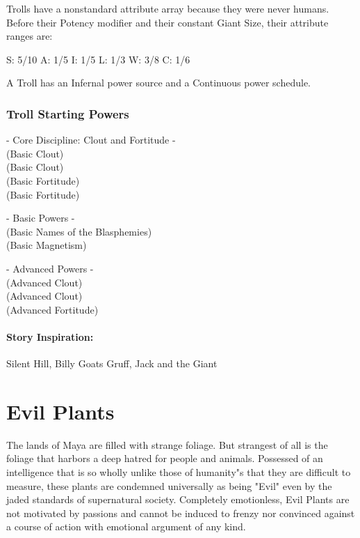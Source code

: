 Trolls have a nonstandard attribute array because they were never humans. Before their Potency modifier and their constant Giant Size, their attribute ranges are:

S: 5/10 A: 1/5 I: 1/5 L: 1/3 W: 3/8 C: 1/6

A Troll has an Infernal power source and a Continuous power schedule.

\subsubsection{Troll Starting Powers}

\hspace{\parindent} - Core Discipline: Clout and Fortitude -\\
 (Basic Clout)\\
 (Basic Clout)\\
 (Basic Fortitude)\\
 (Basic Fortitude)

- Basic Powers -\\
 (Basic Names of the Blasphemies)\\
 (Basic Magnetism)

- Advanced Powers -\\
 (Advanced Clout)\\
 (Advanced Clout)\\
 (Advanced Fortitude)

\paragraph{Story Inspiration:} Silent Hill, Billy Goats Gruff, Jack and the Giant

\section{Evil Plants} 

The lands of Maya are filled with strange foliage. But strangest of all is the foliage that harbors a deep hatred for people and animals. Possessed of an intelligence that is so wholly unlike those of humanity"s that they are difficult to measure, these plants are condemned universally as being "Evil" even by the jaded standards of supernatural society. Completely emotionless, Evil Plants are not motivated by passions and cannot be induced to frenzy nor convinced against a course of action with emotional argument of any kind.

